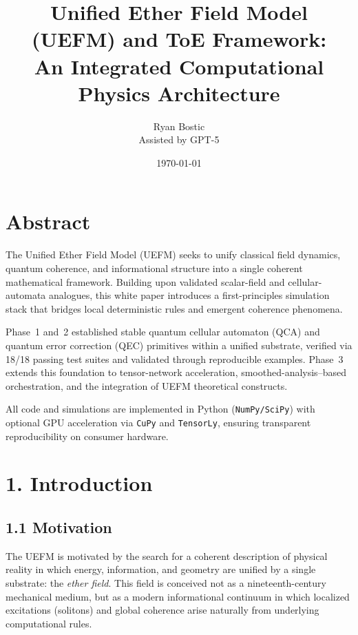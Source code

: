 \documentclass[11pt]{article}
\title{\textbf{Unified Ether Field Model (UEFM) and ToE Framework: \\ 
An Integrated Computational Physics Architecture}}
\author{Ryan Bostic \\ Assisted by GPT-5}
\date{\today}
\begin{document}
\maketitle
\tableofcontents
\newpage

\section{Abstract}

The Unified Ether Field Model (UEFM) seeks to unify classical field dynamics, quantum coherence, and informational structure into a single coherent mathematical framework. Building upon validated scalar-field and cellular-automata analogues, this white paper introduces a first-principles simulation stack that bridges local deterministic rules and emergent coherence phenomena. 

Phase~1 and~2 established stable quantum cellular automaton (QCA) and quantum error correction (QEC) primitives within a unified substrate, verified via 18/18 passing test suites and validated through reproducible examples. Phase~3 extends this foundation to tensor-network acceleration, smoothed-analysis–based orchestration, and the integration of UEFM theoretical constructs.

All code and simulations are implemented in Python (\texttt{NumPy/SciPy}) with optional GPU acceleration via \texttt{CuPy} and \texttt{TensorLy}, ensuring transparent reproducibility on consumer hardware.

\section{1. Introduction}

\subsection*{1.1 Motivation}

The UEFM is motivated by the search for a coherent description of physical reality in which energy, information, and geometry are unified by a single substrate: the \emph{ether field}. This field is conceived not as a nineteenth-century mechanical medium, but as a modern informational continuum in which localized excitations (solitons) and global coherence arise naturally from underlying computational rules.
\end{document}
